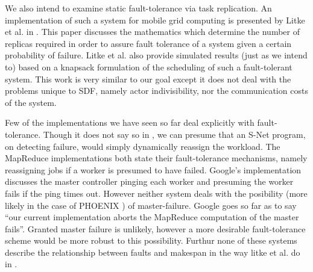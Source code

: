 We also intend to examine static fault-tolerance via task replication.
An implementation of such a system for mobile grid computing is presented by Litke et al. in \cite{lit07}.
This paper discusses the mathematics which determine the number of replicas required in order to assure fault tolerance of a system given a certain probability of failure.
Litke et al. also provide simulated results (just as we intend to) based on a knapsack formulation of the scheduling of such a fault-tolerant system.
This work is very similar to our goal except it does not deal with the problems unique to SDF, namely actor indivisibility, nor the communication costs of the system.

Few of the implementations we have seen so far deal explicitly with fault-tolerance.
Though it does not say so in \cite{pen09}, we can presume that an S-Net program, on detecting failure, would simply dynamically reassign the workload.
The MapReduce implementations \cite{dea08, ran07} both state their fault-tolerance mechanisms, namely reassigning jobs if a worker is presumed to have failed.
Google's implementation discusses the master controller pinging each worker and presuming the worker fails if the ping times out.
However neither system deals with the posibility (more likely in the case of PHOENIX \cite{ran07}) of master-failure.
Google goes so far as to say ``our current implementation aborts the MapReduce computation of the master fails''.
Granted master failure is unlikely, however a more desirable fault-tolerance scheme would be more robust to this possibility.
Furthur none of these systems describe the relationship between faults and makespan in the way litke et al. do in \cite{lit07}.
